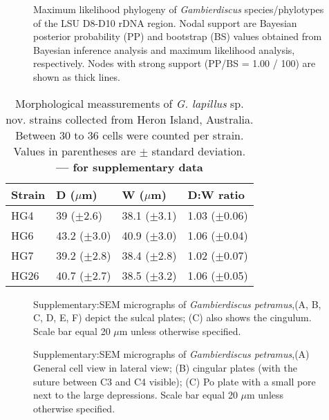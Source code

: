 \documentclass[12pt]{article}
\begin{document}
\begin{figure} 
\caption{Maximum likelihood phylogeny of \textit{Gambierdiscus} species/phylotypes of the LSU D8-D10 rDNA region. Nodal support are Bayesian posterior probability (PP) and bootstrap (BS) values obtained from Bayesian inference analysis and maximum likelihood analysis, respectively. Nodes with strong support (PP/BS = 1.00 / 100) are shown as thick lines.} 
\label{fig:HGD8D10}
\end{figure} 


\FloatBarrier
\begin{table}
\caption{Morphological meassurements of \emph{G. lapillus }sp. nov. strains collected from Heron Island, Australia. Between 30 to 36 cells were counted per strain. Values in parentheses are $\pm$ standard deviation. \textbf{--- for supplementary data}}
\label{tbl:SizeTable}
\begin{tabular}{ | p{2cm} | p{2.5cm} | p{2.5cm} | p{2.5cm} | }
\hline
 \textbf{Strain} & \textbf{D ($\mu$m)} & \textbf{W ($\mu$m)}  & \textbf{D:W ratio}  \\
 \hline
 HG4  & 39 ($\pm$2.6) & 38.1 ($\pm$3.1) & 1.03 ($\pm$0.06) \\

 HG6  & 43.2 ($\pm$3.0) & 40.9 ($\pm$3.0) & 1.06 ($\pm$0.04)  \\

 HG7  & 39.2 ($\pm$2.8) & 38.4 ($\pm$2.8) & 1.02 ($\pm$0.07)  \\

 HG26  & 40.7 ($\pm$2.7) & 38.5 ($\pm$3.2) & 1.06 ($\pm$0.05) \\
 \hline
\end{tabular}
\end{table}
\FloatBarrier

\FloatBarrier 
\begin{figure} 
\caption{Supplementary:SEM micrographs of \emph{Gambierdiscus petramus},(A, B, C, D, E, F) depict the sulcal plates; (C) also shows the cingulum. Scale bar equal 20 $\mu$m unless otherwise specified.} 
\label{fig:sulcSEM}
\end{figure} 
\FloatBarrier

\FloatBarrier 
\begin{figure} 
\caption{Supplementary:SEM micrographs of \emph{Gambierdiscus petramus},(A) General cell view in lateral view; (B) cingular plates (with the suture between C3
and C4 visible); (C) Po plate with a small pore next to the large depressions. Scale bar equal 20 $\mu$m unless otherwise specified.} 
\label{fig:latSEM}
\end{figure} 
\FloatBarrier
\end{document}
